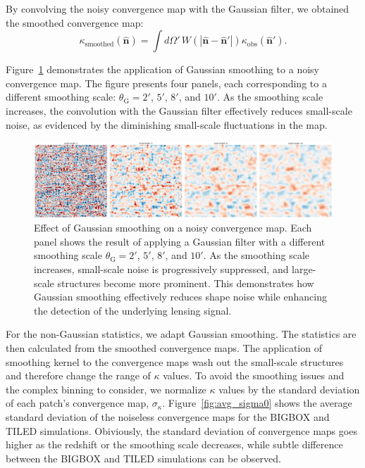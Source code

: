By convolving the noisy convergence map with the Gaussian filter, we obtained the smoothed convergence map:
\begin{equation}
    \kappa_{\mathrm{smoothed}}(\hat{\mathbf{n}}) = \int d\Omega' \, W(|\hat{\mathbf{n}} - \hat{\mathbf{n}}'|) \kappa_{\mathrm{obs}}(\hat{\mathbf{n}}').
\end{equation}

Figure~\ref{fig:smoothing} demonstrates the application of Gaussian smoothing to a noisy convergence map. The figure presents four panels, each corresponding to a different smoothing scale: $\theta_{\mathrm{G}} = 2'$, $5'$, $8'$, and $10'$. As the smoothing scale increases, the convolution with the Gaussian filter effectively reduces small-scale noise, as evidenced by the diminishing small-scale fluctuations in the map. 
\begin{figure}[ht]
    \centering
    \includegraphics[width=\textwidth]{figures/smoothed_comparison.png}
    \caption{Effect of Gaussian smoothing on a noisy convergence map. Each panel shows the result of applying a Gaussian filter with a different smoothing scale $\theta_{\mathrm{G}} = 2'$, $5'$, $8'$, and $10'$. As the smoothing scale increases, small-scale noise is progressively suppressed, and large-scale structures become more prominent. This demonstrates how Gaussian smoothing effectively reduces shape noise while enhancing the detection of the underlying lensing signal.}
\label{fig:smoothing}
\end{figure}

For the non-Gaussian statistics, we adapt Gaussian smoothing. The statistics are then calculated from the smoothed convergence maps. The application of smoothing kernel to the convergence maps wash out the small-scale structures and therefore change the range of $\kappa$ values. To avoid the smoothing issues and the complex binning to consider, we normalize $\kappa$ values by the standard deviation of each patch's convergence map, $\sigma_{\kappa}$. Figure~\ref{fig:avg_sigma0} shows the average standard deviation of the noiseless convergence maps for the BIGBOX and TILED simulations. Obiviously, the standard deviation of convergence maps goes higher as the redshift or the smoothing scale decreases, while subtle difference between the BIGBOX and TILED simulations can be observed.


